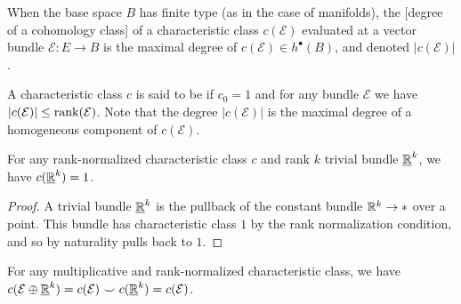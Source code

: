 \begin{remark*}
	When the base space $B$ has finite type (as in the case of manifolds), the [degree of a cohomology class] of a characteristic class $c(\mathcal{E})$ evaluated at a vector bundle $\mathcal{E} : E \to B$ is the maximal degree of $c(\mathcal{E})\in h^\bullet(B)$, and denoted $|c(\mathcal{E})|$.
\end{remark*}

\begin{definition}
	A characteristic class $c$ is said to be  if $c_0=1$ and for any bundle $\mathcal{E}$ we have $|c(\mathcal{E})|\leq \operatorname{rank}(\mathcal{E})$. Note that the degree $|c(\mathcal{E})|$ is the maximal degree of a homogeneous component of $c(\mathcal{E})$.
\end{definition}

\begin{corollary}
	For any rank-normalized characteristic class $c$ and rank $k$ trivial bundle $\underline{\mathbb{R}}^k$, we have $c(\underline{\mathbb{R}}^k)=1$.
\end{corollary}
\begin{proof}
	A trivial bundle $\underline{\mathbb{R}}^k$ is the pullback of the constant bundle $\mathbb{R}^k\to *$ over a point. This bundle has characteristic class $1$ by the rank normalization condition, and so by naturality pulls back to $1$.
\end{proof}
%
%

\begin{corollary}
	For any multiplicative and rank-normalized characteristic class, we have $c(\mathcal{E}\oplus \underline{\mathbb{R}}^k)=c(\mathcal{E})\smile c(\underline{\mathbb{R}}^k)= c(\mathcal{E})$.
\end{corollary}

